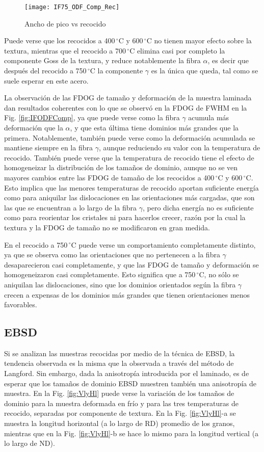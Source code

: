 \begin{figure}[!htb]
  \centering
  \texttt{[image: IF75\_ODF\_Comp\_Rec]}
  \caption{Ancho de pico vs recocido}
  \label{fig:IFMicroRecocido}
\end{figure}

Puede verse que los recocidos a 400\,$^{\circ}$C y 600\,$^{\circ}$C no tienen mayor efecto sobre la textura, mientras que el recocido a 700\,$^{\circ}$C elimina casi por completo la componente Goss de la textura, y reduce notablemente la fibra $\alpha$, es decir que después del recocido a 750\,$^{\circ}$C la componente $\gamma$ es la única que queda, tal como se suele esperar en este acero.

La observación de las FDOG de tamaño y deformación de la muestra laminada dan resultados coherentes con lo que se observó en la FDOG de FWHM en la Fig. \ref{fig:IFODFComp}, ya que puede verse como la fibra $\gamma$ acumula más deformación que la $\alpha$, y que esta última tiene dominios más grandes que la primera.
Notablemente, también puede verse como la deformación acumulada se mantiene siempre en la fibra $\gamma$, aunque reduciendo su valor con la temperatura de recocido.
También puede verse que la temperatura de recocido tiene el efecto de homogeneizar la distribución de los tamaños de dominio, aunque no se ven mayores cambios entre las FDOG de tamaño de los recocidos a 400\,$^{\circ}$C y 600\,$^{\circ}$C.
Esto implica que las menores temperaturas de recocido aportan suficiente energía como para aniquilar las dislocaciones en las orientaciones más cargadas, que son las que se encuentran a lo largo de la fibra $\gamma$, pero dicha energía no es suficiente como para reorientar los cristales ni para hacerlos crecer, razón por la cual la textura y la FDOG de tamaño no se modificaron en gran medida.

En el recocido a 750\,$^{\circ}$C puede verse un comportamiento completamente distinto, ya que se observa como las orientaciones que no pertenecen a la fibra $\gamma$ desaparecieron casi completamente, y que las FDOG de tamaño y deformación se homogeneizaron casi completamente.
Esto significa que a 750\,$^{\circ}$C, no sólo se aniquilan las dislocaciones, sino que los dominios orientados según la fibra $\gamma$ crecen a expensas de los dominios más grandes que tienen orientaciones menos favorables.

\subsection{EBSD}\label{SS:IFRecLang}
Si se analizan las muestras recocidas por medio de la técnica de EBSD, la tendencia observada es la misma que la observada a través del método de Langford.
Sin embargo, dada la anisotropía introducida por el laminado, es de esperar que los tamaños de dominio EBSD muestren también una anisotropía de muestra.
En la Fig. \ref{fig:VlyHl} puede verse la variación de los tamaños de dominio para la muestra deformada en frío y para las tres temperaturas de recocido, separadas por componente de textura.
En la Fig. \ref{fig:VlyHl}-a se muestra la longitud horizontal (a lo largo de RD) promedio de los granos, mientras que en la Fig. \ref{fig:VlyHl}-b se hace lo mismo para la longitud vertical (a lo largo de ND).

